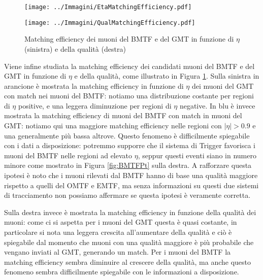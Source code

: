 \begin{figure}[t]
  \centering
  \begin{minipage}[b]{0.49\textwidth}
    \centering
    \texttt{[image: ../Immagini/EtaMatchingEfficiency.pdf]} 
    \end{minipage}
    \hfill 
    \begin{minipage}[b]{0.49\textwidth}
      \centering
      \texttt{[image: ../Immagini/QualMatchingEfficiency.pdf]}
    \end{minipage}
    \caption{Matching efficiency dei muoni del BMTF e del GMT in funzione di $\eta$ (sinistra) e della qualità (destra)}
  \label{fig:MatchingEfficiecyPt3}
\end{figure}

Viene infine studiata la matching efficiency dei candidati muoni del BMTF e del GMT in funzione di $\eta$ e della qualità, come illustrato in Figura \ref{fig:MatchingEfficiecyPt3}. Sulla sinistra in arancione è mostrata la matching efficiency in funzione di $\eta$ dei muoni del GMT con match nei muoni del BMTF: notiamo una distribuzione costante per regioni di $\eta$ positive, e una leggera diminuzione per regioni di $\eta$ negative. In blu è invece mostrata la matching efficiency di muoni del BMTF con match in muoni del GMT: notiamo qui una maggiore matching efficiency nelle regioni con $|\eta| > 0.9$ e una generalmente più bassa altrove. \newline
Questo fenomeno è difficilmente spiegabile con i dati a disposizione: potremmo supporre che il sistema di Trigger favorisca i muoni del BMTF nelle regioni ad elevato $\eta$, seppur questi eventi siano in numero minore come mostrato in Figura \ref{fig:BMTFPt} sulla destra. A rafforzare questa ipotesi è noto che i muoni rilevati dal BMTF hanno di base una qualità maggiore rispetto a quelli del OMTF e EMTF, ma senza informazioni su questi due sistemi di tracciamento non possiamo affermare se questa ipotesi è veramente corretta.

Sulla destra invece è mostrata la matching efficiency in funzione della qualità dei muoni: come ci si aspetta per i muoni del GMT questa è quasi costante, in particolare si nota una leggera crescita all'aumentare della qualità e ciò è spiegabile dal momento che muoni con una qualità maggiore è più probabile che vengano inviati al GMT, generando un match. Per i muoni del BMTF la matching efficiency sembra diminuire al crescere della qualità, ma anche questo fenomeno sembra difficilmente spiegabile con le informazioni a disposizione.



